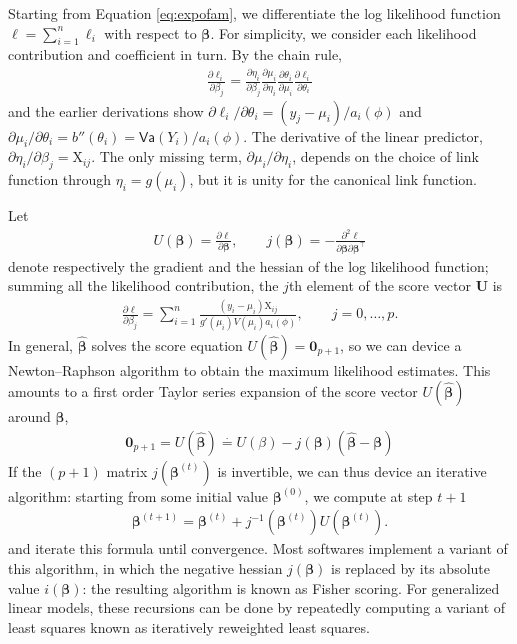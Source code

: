 \documentclass[
  11pt,
  letterpaper,
]{book}
\theoremstyle{definition}
\theoremstyle{definition}
\theoremstyle{definition}
\theoremstyle{definition}
\theoremstyle{remark}
\begin{document}
Starting from Equation \eqref{eq:expofam}, we differentiate the log likelihood function \(\ell = \sum_{i=1}^n \ell_i\) with respect to
\(\boldsymbol{\beta}\). For simplicity, we consider each likelihood
contribution and coefficient in turn. By the chain rule, \begin{align*}
\frac{\partial \ell_i}{\partial \beta_j} = \frac{\partial
\eta_i}{\partial \beta_j} \frac{\partial \mu_i}{\partial \eta_i}
\frac{\partial \theta_i}{\partial \mu_i}\frac{\partial
\ell_i}{\partial \theta_i}
\end{align*}
and the earlier derivations show \(\partial \ell_i/\partial \theta_i = (y_j-\mu_i)/a_i(\phi)\) and \(\partial \mu_i / \partial \theta_i = b''(\theta_i) = \mathsf{Va}(Y_i)/a_i(\phi)\).
The derivative of the linear predictor, \(\partial \eta_i / \partial \beta_j = \mathrm{X}_{ij}\). The only missing term, \(\partial \mu_i/\partial \eta_i\), depends on the choice of link function through \(\eta_i = g(\mu_i)\), but it is unity for the canonical link function.

Let
\begin{align*}
U(\boldsymbol{\beta}) = \frac{\partial \ell}{\partial \boldsymbol{\beta}}, \qquad j(\boldsymbol{\beta}) = - \frac{\partial^2 \ell}{\partial \boldsymbol{\beta} \partial \boldsymbol{\beta}^\top}
\end{align*}
denote respectively the gradient and the hessian of the log likelihood function; summing all the likelihood contribution, the \(j\)th element of the score vector
\(\boldsymbol{U}\) is
\begin{align*}
\frac{\partial \ell}{\partial \beta_j} = \sum_{i=1}^n \frac{(y_i-\mu_i)\mathrm{X}_{ij}}{g'(\mu_i)V(\mu_i)a_i(\phi)}, \qquad j=0, \ldots, p.
\end{align*}
In general, \(\widehat{\boldsymbol{\beta}}\) solves the score equation \(U(\widehat{\boldsymbol{\beta}})=\boldsymbol{0}_{p+1}\), so we can device a Newton--Raphson algorithm to obtain the maximum likelihood
estimates. This amounts to a first order Taylor series expansion of
the score vector \(U(\widehat{\boldsymbol{\beta}})\) around \(\boldsymbol{\beta}\),
\begin{align*}
\boldsymbol{0}_{p+1} = U(\widehat{\boldsymbol{\beta}}) \stackrel{\cdot}{=} U(\beta) - j(\boldsymbol{\beta}) (\widehat{\boldsymbol{\beta}}-\boldsymbol{\beta})
\end{align*}
If the \((p+1)\) matrix \(j(\boldsymbol{\beta}^{(t)})\) is
invertible, we can thus device an iterative algorithm: starting from
some initial value \(\boldsymbol{\beta}^{(0)}\), we compute at step \(t+1\)
\begin{align*}
\boldsymbol{\beta}^{(t+1)} = \boldsymbol{\beta}^{(t)} + j^{-1}(\boldsymbol{\beta}^{(t)})U(\boldsymbol{\beta}^{(t)}).
\end{align*}
and iterate this formula until convergence. Most softwares
implement a variant of this algorithm, in which the negative hessian
\(j(\boldsymbol{\beta})\) is replaced by its absolute value
\(i(\boldsymbol{\beta})\): the resulting algorithm is known as Fisher
scoring. For generalized linear models, these recursions can be done by
repeatedly computing a variant of least squares known as iteratively
reweighted least squares.
\end{document}
